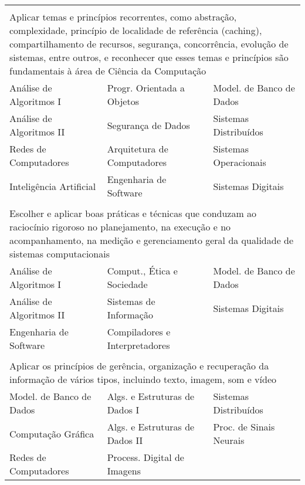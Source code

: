 \begin{longtable}{|p{}p{}p{}|}
    \multicolumn{3}{p{0.95\textwidth}}{}\\
    \multicolumn{3}{p{0.95\textwidth}}{Aplicar temas e princípios recorrentes, como
    abstração, complexidade, princípio de localidade de referência (caching),
    compartilhamento de recursos, segurança, concorrência, evolução de
    sistemas, entre outros, e reconhecer que esses temas e princípios são
    fundamentais à área de Ciência da Computação}\\
    \hline
    \textcolor{nblue}{Análise de Algoritmos I} &
    \textcolor{nblue}{Progr. Orientada a Objetos} &
    \textcolor{nblue}{\small Model. de Banco de Dados}\\
    \textcolor{nblue}{Análise de Algoritmos II} &
    \textcolor{nblue}{Segurança de Dados} &
    \textcolor{nblue}{Sistemas Distribuídos}\\
    \textcolor{nblue}{Redes de Computadores} & 
    \textcolor{nblue}{Arquitetura de Computadores} &
    \textcolor{nblue}{Sistemas Operacionais}\\
    \textcolor{nblue}{Inteligência Artificial} & 
    \textcolor{nblue}{Engenharia de Software} &
    \textcolor{nblue}{Sistemas Digitais}\\
    \hline
    
    
    \multicolumn{3}{p{0.95\textwidth}}{}\\
    \multicolumn{3}{p{0.95\textwidth}}{Escolher e aplicar boas práticas e técnicas
    que conduzam ao raciocínio rigoroso no planejamento, na execução e no
    acompanhamento, na medição e gerenciamento geral da qualidade de sistemas
    computacionais}\\
    \hline
    \textcolor{nblue}{Análise de Algoritmos I} &
    \textcolor{nblue}{Comput., Ética e Sociedade} &
    \textcolor{nblue}{\small Model. de Banco de Dados}\\
    \textcolor{nblue}{Análise de Algoritmos II} &
    \textcolor{nyellow}{Sistemas de Informação} &
    \textcolor{nblue}{Sistemas Digitais}\\
    \textcolor{nblue}{Engenharia de Software} &
    \textcolor{nblue}{Compiladores e Interpretadores} & \\
    \hline
    
    
    \multicolumn{3}{p{0.95\textwidth}}{}\\
    \multicolumn{3}{p{0.95\textwidth}}{Aplicar os princípios de gerência,
    organização e recuperação da informação de vários tipos, incluindo texto,
    imagem, som e vídeo}\\
    \hline
    \textcolor{nblue}{\small Model. de Banco de Dados} &
    \textcolor{nblue}{Algs. e Estruturas de Dados I} & 
    \textcolor{nblue}{Sistemas Distribuídos}\\
    \textcolor{nblue}{Computação Gráfica} &
    \textcolor{nblue}{Algs. e Estruturas de Dados II} &
    \textcolor{nyellow}{Proc. de Sinais Neurais} \\
    \textcolor{nblue}{Redes de Computadores} & 
    \textcolor{nyellow}{Process. Digital de Imagens} & \\
    \hline
    

\end{longtable}
